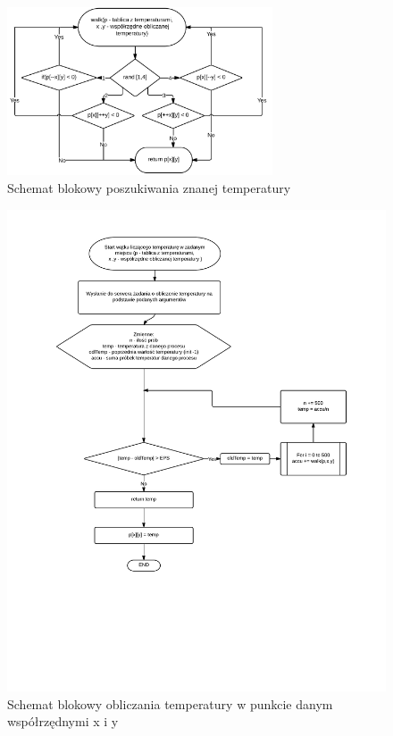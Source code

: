 \documentclass[11pt,a4paper]{article}
\begin{document}
\begin{figure}[H]
\begin{center}
\includegraphics[width=0.7\textwidth]{schemat2.png}
\caption{Schemat blokowy poszukiwania znanej temperatury}
\end{center}
\end{figure}

\begin{figure}[H]
\begin{center}
\includegraphics[width=1.0\textwidth]{schemat1.png}
\caption{Schemat blokowy obliczania temperatury w punkcie danym współrzędnymi x i y}
\end{center}
\end{figure}
\end{document}
